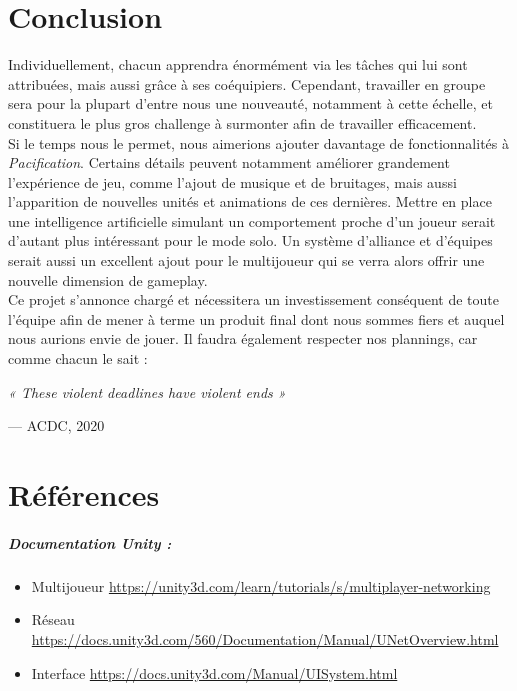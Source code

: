 \documentclass[12pt]{report}
\begin{document}
\chapter{Conclusion}

Individuellement, chacun apprendra énormément via les tâches qui lui sont attribuées, mais aussi grâce à ses coéquipiers. Cependant, travailler en groupe sera pour la plupart d’entre nous une nouveauté, notamment à cette échelle, et constituera le plus gros challenge à surmonter afin de travailler efficacement.\\

Si le temps nous le permet, nous aimerions ajouter davantage de fonctionnalités à \textit{Pacification}. Certains détails peuvent notamment améliorer grandement l’expérience de jeu, comme l’ajout de musique et de bruitages, mais aussi l’apparition de nouvelles unités et animations de ces dernières. Mettre en place une intelligence artificielle simulant un comportement proche d’un joueur serait d’autant plus intéressant pour le mode solo. Un système d’alliance et d’équipes serait aussi un excellent ajout pour le multijoueur qui se verra alors offrir une nouvelle dimension de gameplay.\\

 Ce projet s’annonce chargé et nécessitera un investissement conséquent de toute l’équipe afin de mener à terme un produit final dont nous sommes fiers et auquel nous aurions envie de jouer. Il faudra également respecter nos plannings, car comme chacun le sait :


\epigraph{\textit{« These violent deadlines have violent ends »}}{--- \textup{ACDC, 2020}}

\chapter{Références}

\paragraph{\bfseries{Documentation Unity :}}

\begin{itemize}[label=\textbullet]
\item Multijoueur \url{https://unity3d.com/learn/tutorials/s/multiplayer-networking}
\item Réseau \url{https://docs.unity3d.com/560/Documentation/Manual/UNetOverview.html}
\item Interface \url{https://docs.unity3d.com/Manual/UISystem.html}
\end{itemize}
\end{document}
